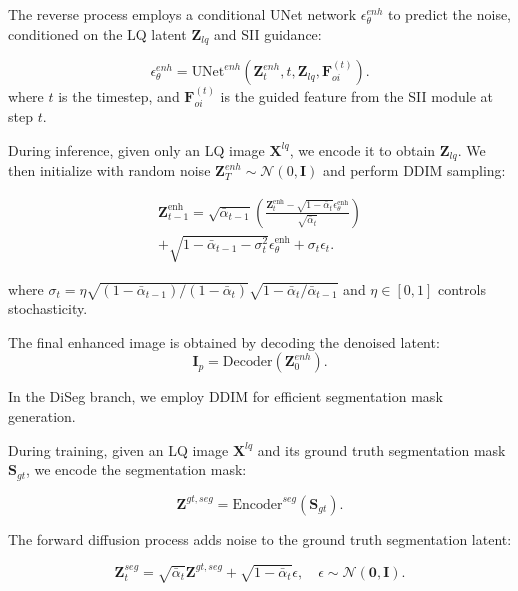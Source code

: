 \documentclass{article}
\begin{document}
The reverse process employs a conditional UNet network $\epsilon_\theta^{enh}$ to predict the noise, conditioned on the LQ latent $\mathbf{Z}_{lq}$ and SII guidance:

\begin{equation}
\epsilon_\theta^{enh} = \text{UNet}^{enh}(\mathbf{Z}_t^{enh}, t, \mathbf{Z}_{lq}, \mathbf{F}_{oi}^{(t)}).
\end{equation}
where $t$ is the timestep, and $\mathbf{F}_{oi}^{(t)}$ is the guided feature from the SII module at step $t$.

During inference, given only an LQ image $\mathbf{X}^{lq}$, we encode it to obtain $\mathbf{Z}_{lq}$. We then initialize with random noise $\mathbf{Z}_T^{enh} \sim \mathcal{N}(0, \mathbf{I})$ and perform DDIM sampling:

\begin{equation}
\begin{split}
\mathbf{Z}_{t-1}^{\text{enh}} 
= \sqrt{\bar{\alpha}_{t-1}}\left(
\frac{\mathbf{Z}_t^{\text{enh}} - \sqrt{1-\bar{\alpha}_t}\epsilon_\theta^{\text{enh}}}
{\sqrt{\bar{\alpha}_t}}
\right) \\
+ \sqrt{1-\bar{\alpha}_{t-1} - \sigma_t^2}\epsilon_\theta^{\text{enh}} 
+ \sigma_t\epsilon_t.
\end{split}
\end{equation}

where $\sigma_t = \eta\sqrt{(1-\bar{\alpha}_{t-1})/(1-\bar{\alpha}_t)}\sqrt{1-\bar{\alpha}_t/\bar{\alpha}_{t-1}}$ and $\eta\in [0,1]$ controls stochasticity.


The final enhanced image is obtained by decoding the denoised latent:
\begin{equation}
\mathbf{I}_p = \text{Decoder}(\mathbf{Z}_0^{enh}).
\end{equation}



In the DiSeg branch, we employ DDIM for efficient segmentation mask generation. 


During training, given an LQ image $\mathbf{X}^{lq}$ and its ground truth segmentation mask $\mathbf{S}_{gt}$, we encode the segmentation mask:

\begin{equation}
\mathbf{Z}^{gt,seg} = \text{Encoder}^{seg}(\mathbf{S}_{gt}).
\end{equation}

The forward diffusion process adds noise to the ground truth segmentation latent:

\begin{equation}
\mathbf{Z}_t^{seg} = \sqrt{\bar{\alpha}_t}\mathbf{Z}^{gt,seg} + \sqrt{1-\bar{\alpha}_t}\epsilon, \quad \epsilon \sim \mathcal{N}(\mathbf{0}, \mathbf{I}).
\end{equation}
\end{document}
